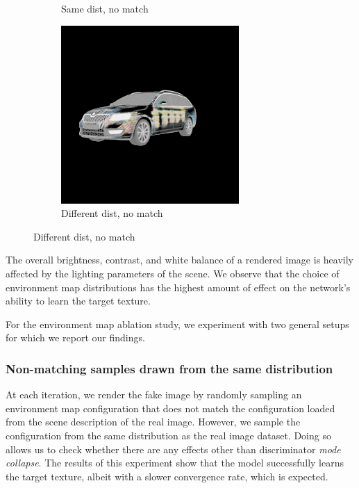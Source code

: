 \begin{figure}
\begin{subfigure}[t]{0.24\linewidth}
        \caption{Same dist, no match}
        \label{fig:pose-vary-sim}
    \end{subfigure}
    \begin{subfigure}[t]{0.24\linewidth}
        \centering
        \includegraphics[width=\linewidth]{graphics/envmap_diff.png}
        \caption{Different dist, no match}
    \end{subfigure}
\end{figure}

The overall brightness, contrast, and white balance of a rendered image is heavily affected
by the lighting parameters of the scene. We observe that the choice of environment map
distributions has the highest amount of effect on the network's ability to learn the target
texture.

For the environment map ablation study, we experiment with two general setups for which we
report our findings.

\subsubsection{Non-matching samples drawn from the same distribution}

At each iteration, we render the fake image by randomly sampling an environment map
configuration that does not match the configuration loaded from the scene description of the
real image. However, we sample the configuration from the same distribution as the real image
dataset. Doing so allows us to check whether there are any effects other than discriminator
\emph{mode collapse}. The results of this experiment show that the model successfully learns
the target texture, albeit with a slower convergence rate, which is expected.

